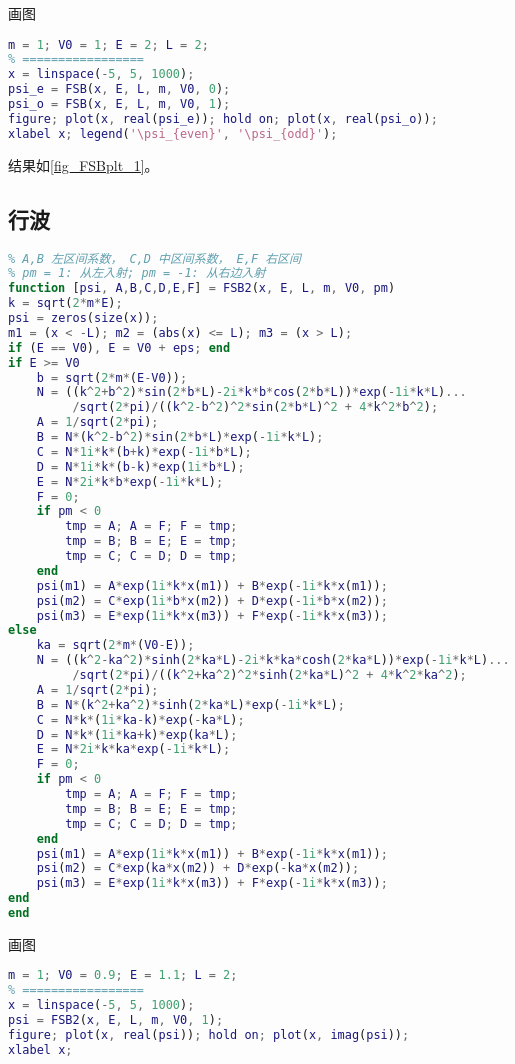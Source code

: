 画图
\begin{lstlisting}[language=matlab, caption=FSB\_demo.m]
% === 设置参数 =====
m = 1; V0 = 1; E = 2; L = 2;
% =================
x = linspace(-5, 5, 1000);
psi_e = FSB(x, E, L, m, V0, 0);
psi_o = FSB(x, E, L, m, V0, 1);
figure; plot(x, real(psi_e)); hold on; plot(x, real(psi_o));
xlabel x; legend('\psi_{even}', '\psi_{odd}');
\end{lstlisting}
结果如\autoref{fig_FSBplt_1}。

\subsection{行波}

\begin{lstlisting}[language=matlab, caption=FSB2.m]
% m 质量，V0 势垒，E 能量， L 势垒半宽， odd 奇函数 true 偶函数 false
% A,B 左区间系数， C,D 中区间系数， E,F 右区间
% pm = 1: 从左入射; pm = -1: 从右边入射
function [psi, A,B,C,D,E,F] = FSB2(x, E, L, m, V0, pm)
k = sqrt(2*m*E);
psi = zeros(size(x));
m1 = (x < -L); m2 = (abs(x) <= L); m3 = (x > L);
if (E == V0), E = V0 + eps; end
if E >= V0
    b = sqrt(2*m*(E-V0));
    N = ((k^2+b^2)*sin(2*b*L)-2i*k*b*cos(2*b*L))*exp(-1i*k*L)...
         /sqrt(2*pi)/((k^2-b^2)^2*sin(2*b*L)^2 + 4*k^2*b^2);
    A = 1/sqrt(2*pi);
    B = N*(k^2-b^2)*sin(2*b*L)*exp(-1i*k*L);
    C = N*1i*k*(b+k)*exp(-1i*b*L);
    D = N*1i*k*(b-k)*exp(1i*b*L);
    E = N*2i*k*b*exp(-1i*k*L);
    F = 0;
    if pm < 0
        tmp = A; A = F; F = tmp;
        tmp = B; B = E; E = tmp;
        tmp = C; C = D; D = tmp;
    end
    psi(m1) = A*exp(1i*k*x(m1)) + B*exp(-1i*k*x(m1));
    psi(m2) = C*exp(1i*b*x(m2)) + D*exp(-1i*b*x(m2));
    psi(m3) = E*exp(1i*k*x(m3)) + F*exp(-1i*k*x(m3));
else
    ka = sqrt(2*m*(V0-E));
    N = ((k^2-ka^2)*sinh(2*ka*L)-2i*k*ka*cosh(2*ka*L))*exp(-1i*k*L)...
         /sqrt(2*pi)/((k^2+ka^2)^2*sinh(2*ka*L)^2 + 4*k^2*ka^2);
    A = 1/sqrt(2*pi);
    B = N*(k^2+ka^2)*sinh(2*ka*L)*exp(-1i*k*L);
    C = N*k*(1i*ka-k)*exp(-ka*L);
    D = N*k*(1i*ka+k)*exp(ka*L);
    E = N*2i*k*ka*exp(-1i*k*L);
    F = 0;
    if pm < 0
        tmp = A; A = F; F = tmp;
        tmp = B; B = E; E = tmp;
        tmp = C; C = D; D = tmp;
    end
    psi(m1) = A*exp(1i*k*x(m1)) + B*exp(-1i*k*x(m1));
    psi(m2) = C*exp(ka*x(m2)) + D*exp(-ka*x(m2));
    psi(m3) = E*exp(1i*k*x(m3)) + F*exp(-1i*k*x(m3));
end
end

\end{lstlisting}

画图
\begin{lstlisting}[language=matlab, caption=FSB2\_demo.m]
% === 设置参数 =====
m = 1; V0 = 0.9; E = 1.1; L = 2;
% =================
x = linspace(-5, 5, 1000);
psi = FSB2(x, E, L, m, V0, 1);
figure; plot(x, real(psi)); hold on; plot(x, imag(psi));
xlabel x;
\end{lstlisting}

